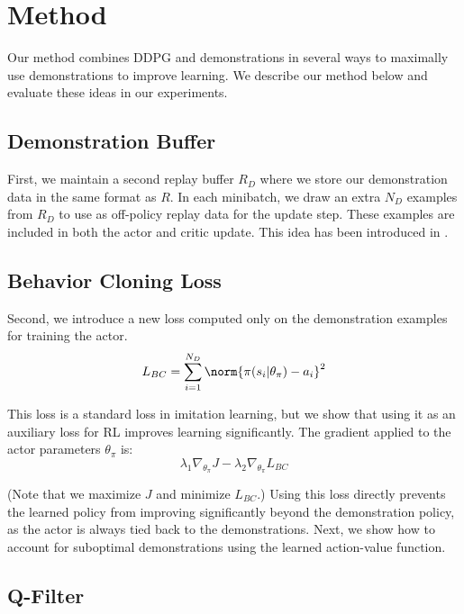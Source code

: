 \section{Method} \label{sec:method}

Our method combines DDPG and demonstrations in several ways to maximally use demonstrations to improve learning. We describe our method below and evaluate these ideas in our experiments.

\subsection{Demonstration Buffer} 

First, we maintain a second replay buffer $R_D$ where we store our demonstration data in the same format as $R$. In each minibatch, we draw an extra $N_D$ examples from $R_D$ to use as off-policy replay data for the update step. These examples are included in both the actor and critic update. This idea has been introduced in \cite{vecerik17ddpgfd}.

\subsection{Behavior Cloning Loss}

Second, we introduce a new loss computed only on the demonstration examples for training the actor.
\begin{equation}\label{eq:BC}
    L_{BC} = \sum_{i=1}^{N_D} \norm{\pi(s_i|\theta_\pi) - a_i}^2
\end{equation}

\noindent This loss is a standard loss in imitation learning, but we show that using it as an auxiliary loss for RL improves learning significantly. The gradient applied to the actor parameters $\theta_\pi$ is:
\begin{equation} \label{eqn:aux}
    \lambda_1 \nabla_{\theta_\pi} J - \lambda_2 \nabla_{\theta_\pi} L_{BC}
\end{equation}

\noindent (Note that we maximize $J$ and minimize $L_{BC}$.) Using this loss directly prevents the learned policy from improving significantly beyond the demonstration policy, as the actor is always tied back to the demonstrations. Next, we show how to account for suboptimal demonstrations using the learned action-value function.

\subsection{Q-Filter}\label{sec:ours}


